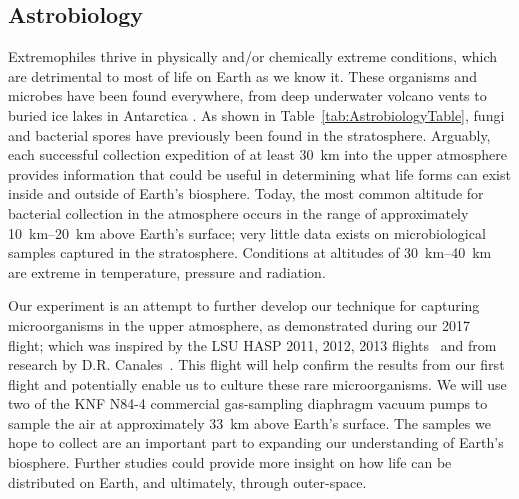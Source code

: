 \subsection{Astrobiology}
\label{sec:AstrobiologyBackground}

Extremophiles thrive in physically and/or chemically extreme conditions, which are detrimental to most of life on Earth as we know it. These organisms and microbes have been found everywhere, from deep underwater volcano vents to buried ice lakes in Antarctica \cite{Extremophiles}.  As shown in Table~\ref{tab:AstrobiologyTable}, fungi and bacterial spores have previously been found in the stratosphere. Arguably, each successful collection expedition of at least \SI{30}{\kilo\meter} into the upper atmosphere provides information that could be useful in determining what life forms can exist inside and outside of Earth's biosphere. Today, the most common altitude for bacterial collection in the atmosphere occurs in the range of approximately \SIrange{10}{20}{\kilo\meter} above Earth's surface; very little data exists on microbiological samples captured in the stratosphere. Conditions at altitudes of \SIrange{30}{40}{\kilo\meter} are extreme in temperature, pressure and radiation. 

	




Our experiment is an attempt to further develop our technique for capturing microorganisms in the upper atmosphere, as demonstrated during our 2017~\cite{SORA} flight; which was inspired by the LSU HASP 2011, 2012, 2013 flights~\cite{LSU} and from research by D.R. Canales~\cite{canales}.  This flight will help confirm the results from our first flight and potentially enable us to culture these rare microorganisms.  We will use two of the KNF N84-4 commercial gas-sampling diaphragm vacuum pumps to sample the air at approximately \SI{33}{\kilo\meter} above Earth's surface. The samples we hope to collect are an important part to expanding our understanding of Earth's biosphere. Further studies could provide more insight on how life can be distributed on Earth, and ultimately, through outer-space.

